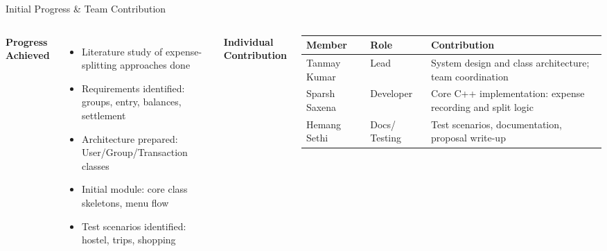 \documentclass[aspectratio=169,11pt]{beamer}
\begin{document}
\begin{frame}{Initial Progress \& Team Contribution}
\small
\begin{columns}[T,totalwidth=\textwidth]
\textbf{\color{GEUBlue}Progress Achieved}
\begin{itemize}\itemsep2pt
\item Literature study of expense-splitting approaches done
\item Requirements identified: groups, entry, balances, settlement
\item Architecture prepared: User/Group/Transaction classes
\item Initial module: core class skeletons, menu flow
\item Test scenarios identified: hostel, trips, shopping
\end{itemize}
\textbf{\color{GEUBlue}Individual Contribution}
\vspace{2mm}
\scriptsize
\begin{tabularx}{\textwidth}{@{}>{\raggedright\arraybackslash}p{2.1cm}>{\raggedright\arraybackslash}p{1.5cm}>{\raggedright\arraybackslash}X@{}}
\toprule
Member & Role & Contribution\\
\midrule
Tanmay Kumar & Lead & System design and class architecture; team coordination\\
Sparsh Saxena & Developer & Core C++ implementation: expense recording and split logic\\
Hemang Sethi & Docs/ Testing & Test scenarios, documentation, proposal write-up\\
\bottomrule
\end{tabularx}
\end{columns}
\end{frame}
\end{document}
